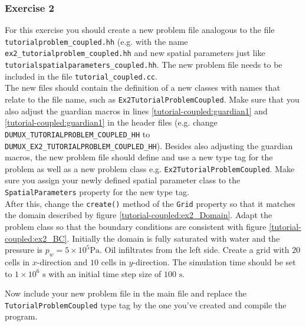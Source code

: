 \subsubsection{Exercise 2}
For this exercise you should create a new problem file analogous to
the file \texttt{tutorialproblem\_coupled.hh} (e.g. with the name 
\texttt{ex2\_tutorialproblem\_coupled.hh} and new spatial parameters 
just like \texttt{tutorialspatialparameters\_coupled.hh}. The new problem file needs to
be included in the file \texttt{tutorial\_coupled.cc}.\\
The new files should contain the definition of a new classes with 
names that relate to the file name, such as 
\texttt{Ex2TutorialProblemCoupled}. Make sure that you also adjust the guardian
macros in lines \ref{tutorial-coupled:guardian1} and \ref{tutorial-coupled:guardian1}
 in the header files (e.g. change \\
\texttt{DUMUX\_TUTORIALPROBLEM\_COUPLED\_HH} to
\texttt{DUMUX\_EX2\_TUTORIALPROBLEM\_COUPLED\_HH}). Besides also adjusting the guardian macros, 
the new problem file should define and use a new type tag for the problem as well as a new problem class
e.g. \texttt{Ex2TutorialProblemCoupled}. Make sure you assign your newly defined spatial 
parameter class to the \texttt{SpatialParameters} property for the new 
type tag. \\
After this, change the \texttt{create()} method of the \texttt{Grid}
property so that it matches the domain described
by figure \ref{tutorial-coupled:ex2_Domain}. Adapt the problem class
so that the boundary conditions are consistent with figure
\ref{tutorial-coupled:ex2_BC}. Initially the domain is fully saturated
with water and the pressure is $p_w = 5 \times 10^5 \text{Pa}$. Oil
infiltrates from the left side. Create a grid with $20$ cells in
$x$-direction and $10$ cells in $y$-direction. The simulation time
should be set to $1\times 10^6 \text{ s}$ with an initial time step size of
$100 \text{ s}$.

Now include your new problem file in the main file and replace the
\texttt{TutorialProblemCoupled} type tag by the one you've created and
compile the program.


